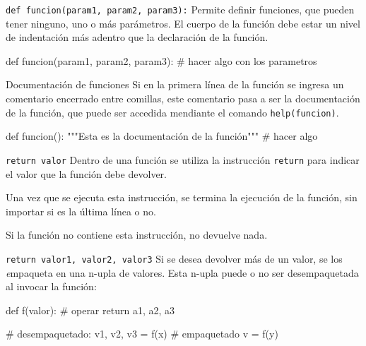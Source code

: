 \begin{referencia_python}

\begin{sintaxis}{\lstinline!def funcion(param1, param2, param3):!}
Permite definir funciones, que pueden tener ninguno, uno o más
parámetros.  El cuerpo de la función debe estar un nivel de indentación
más adentro que la declaración de la función.

\begin{codigo-python-sn}
def funcion(param1, param2, param3):
    # hacer algo con los parametros
\end{codigo-python-sn}
\end{sintaxis}

\begin{sintaxis}{Documentación de funciones}
Si en la primera línea de la función se ingresa un comentario
encerrado entre comillas, este comentario pasa a ser la documentación
de la función, que puede ser accedida mendiante el comando
\lstinline!help(funcion)!.
\begin{codigo-python-sn}
def funcion():
    """Esta es la documentación de la función"""
    # hacer algo
\end{codigo-python-sn}
\end{sintaxis}

\begin{sintaxis}{\lstinline!return valor!}
Dentro de una función se utiliza la instrucción \lstinline!return!
para indicar el valor que la función debe devolver.

Una vez que se ejecuta esta instrucción, se termina la ejecución de la
función, sin importar si es la última línea o no.

Si la función no contiene esta instrucción, no devuelve nada.
\end{sintaxis}

\begin{sintaxis}{\lstinline!return valor1, valor2, valor3!}
Si se desea devolver más de un valor, se los {\textit empaqueta} en
una n-upla de valores.  Esta n-upla puede o no ser desempaquetada al
invocar la función:
\begin{codigo-python-sn}
def f(valor):
    # operar
    return a1, a2, a3

# desempaquetado:
v1, v2, v3 = f(x)
# empaquetado
v = f(y)
\end{codigo-python-sn}
\end{sintaxis}

\end{referencia_python}

